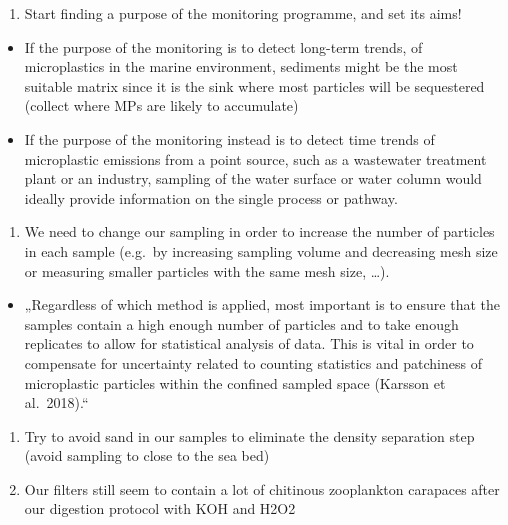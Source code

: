 \documentclass[
  icelandic,
]{book}
\providecommand{\tightlist}{%
  \setlength{\itemsep}{0pt}\setlength{\parskip}{0pt}}
\begin{document}
\begin{enumerate}
\def\labelenumi{\arabic{enumi}.}
\tightlist
\item
  Start finding a purpose of the monitoring programme, and set its aims!
\end{enumerate}

\begin{itemize}
\tightlist
\item
  If the purpose of the monitoring is to detect long-term trends, of microplastics in the marine environment, sediments might be the most suitable matrix since it is the sink where most particles will be sequestered (collect where MPs are likely to accumulate)
\item
  If the purpose of the monitoring instead is to detect time trends of microplastic emissions from a point source, such as a wastewater treatment plant or an industry, sampling of the water surface or water column would ideally provide information on the single process or pathway.
\end{itemize}

\begin{enumerate}
\def\labelenumi{\arabic{enumi}.}
\setcounter{enumi}{1}
\tightlist
\item
  We need to change our sampling in order to increase the number of particles in each sample (e.g.~by increasing sampling volume and decreasing mesh size or measuring smaller particles with the same mesh size, \ldots).
\end{enumerate}

\begin{itemize}
\tightlist
\item
  „Regardless of which method is applied, most important is to ensure that the samples contain a high enough number of particles and to take enough replicates to allow for statistical analysis of data. This is vital in order to compensate for uncertainty related to counting statistics and patchiness of microplastic particles within the confined sampled space (Karsson et al.~2018).``
\end{itemize}

\begin{enumerate}
\def\labelenumi{\arabic{enumi}.}
\setcounter{enumi}{2}
\item
  Try to avoid sand in our samples to eliminate the density separation step (avoid sampling to close to the sea bed)
\item
  Our filters still seem to contain a lot of chitinous zooplankton carapaces after our digestion protocol with KOH and H2O2
\end{enumerate}
\end{document}
